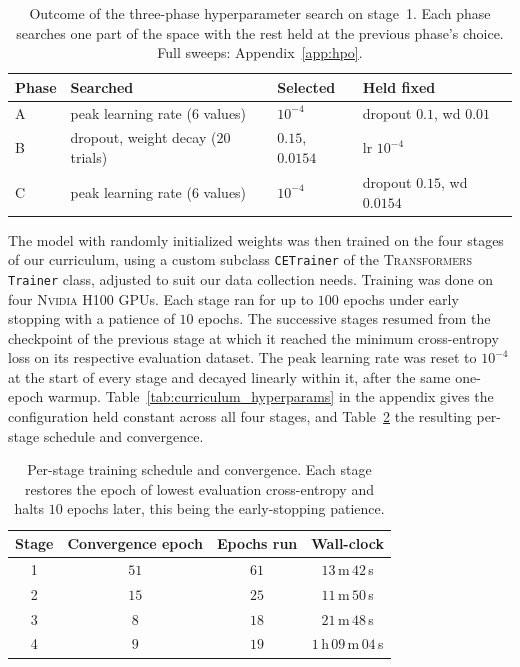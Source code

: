 \documentclass[titlepage,a4paper,11pt]{report}
\begin{document}
    \begin{table}[ht]
        \centering
        \caption{Outcome of the three-phase hyperparameter search on stage~1. Each phase searches one part of the space with the rest held at the previous phase's choice. Full sweeps: Appendix~\ref{app:hpo}.}
        \label{tab:hpo_summary}
        \begin{tabular}{llll}
            \toprule
            Phase & Searched & Selected & Held fixed \\
            \midrule
            A & peak learning rate ($6$ values)   & $10^{-4}$        & dropout $0.1$, wd $0.01$ \\
            B & dropout, weight decay ($20$ trials) & $0.15$, $0.0154$ & lr $10^{-4}$ \\
            C & peak learning rate ($6$ values)   & $10^{-4}$        & dropout $0.15$, wd $0.0154$ \\
            \bottomrule
        \end{tabular}
    \end{table}
    
    The model with randomly initialized weights was then trained on the four stages of our curriculum, using a custom subclass \texttt{CETrainer} of the \textsc{Transformers} \texttt{Trainer} class, adjusted to suit our data collection needs. Training was done on four \textsc{Nvidia H100} GPUs. Each stage ran for up to $100$ epochs under early stopping with a patience of $10$ epochs. The successive stages resumed from the checkpoint of the previous stage at which it reached the minimum cross-entropy loss on its respective evaluation dataset. The peak learning rate was reset to $10^{-4}$ at the start of every stage and decayed linearly within it, after the same one-epoch warmup. Table~\ref{tab:curriculum_hyperparams} in the appendix gives the configuration held constant across all four stages, and Table~\ref{tab:pretraining} the resulting per-stage schedule and convergence.
    
    \begin{table}[ht]
    \centering
    \caption{Per-stage training schedule and convergence. Each stage restores the epoch of lowest evaluation cross-entropy and halts $10$ epochs later, this being the early-stopping patience.}
    \label{tab:pretraining}
    \begin{tabular}{cccc}
        \toprule
        Stage & Convergence epoch & Epochs run & Wall-clock \\
        \midrule
        1 & $51$ & $61$ & $13$\,m\,$42$\,s \\
        2 & $15$ & $25$ & $11$\,m\,$50$\,s \\
        3 & $8$  & $18$ & $21$\,m\,$48$\,s \\
        4 & $9$  & $19$ & $1$\,h\,$09$\,m\,$04$\,s \\
        \bottomrule
    \end{tabular}
    \end{table}
\end{document}
